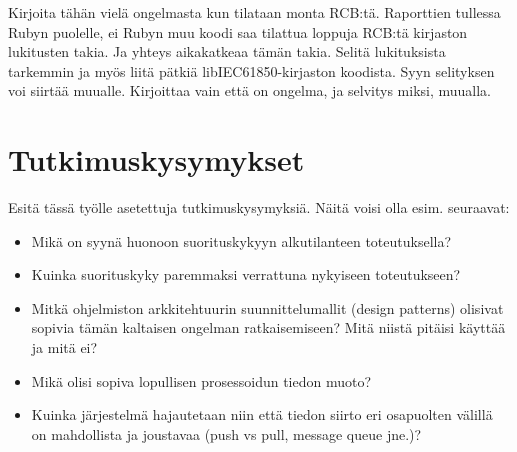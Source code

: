 \begin{it}
	Kirjoita tähän vielä ongelmasta kun tilataan monta RCB:tä. Raporttien tullessa Rubyn puolelle, ei Rubyn muu koodi saa tilattua loppuja RCB:tä kirjaston lukitusten takia. Ja yhteys aikakatkeaa tämän takia. Selitä lukituksista tarkemmin ja myös liitä pätkiä libIEC61850-kirjaston koodista. Syyn selityksen voi siirtää muualle. Kirjoittaa vain että on ongelma, ja selvitys miksi, muualla.
\end{it}

\section{Tutkimuskysymykset}
\begin{it}
Esitä tässä työlle asetettuja tutkimuskysymyksiä. Näitä voisi olla esim. seuraavat:
	\begin{itemize}
		\item Mikä on syynä huonoon suorituskykyyn alkutilanteen toteutuksella?
		\item Kuinka suorituskyky paremmaksi verrattuna nykyiseen toteutukseen?
		\item Mitkä ohjelmiston arkkitehtuurin suunnittelumallit (design patterns) olisivat sopivia tämän kaltaisen ongelman ratkaisemiseen? Mitä niistä pitäisi käyttää ja mitä ei?
		\item Mikä olisi sopiva lopullisen prosessoidun tiedon muoto?
		\item Kuinka järjestelmä hajautetaan niin että tiedon siirto eri osapuolten välillä on mahdollista ja joustavaa (push vs pull, message queue jne.)?
	\end{itemize}
\end{it}
